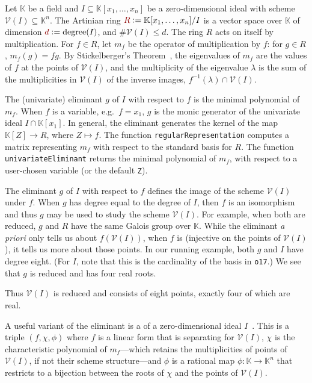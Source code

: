 \documentclass[12pt]{amsart}
\theoremstyle{definition}
\newcommand{\KK}{\mathbb{K}}
\newcommand{\calV}{\mathcal{V}}
\newcommand{\defcolor}[1]{{\color{TAMU}#1}}
\newcommand{\demph}[1]{\defcolor{{\sl #1}}}
\begin{document}
Let  $\KK$ be a field and $I\subseteq\KK[x_1,\dotsc,x_n]$ be a zero-dimension\-al ideal  with scheme $\calV(I)\subseteq\KK^n$.
The Artinian ring $\defcolor{R}\vcentcolon=\KK[x_1,\dotsc,x_n]/I$ is a vector space over $\KK$ of dimension
$\defcolor{d}\vcentcolon=\mbox{degree}(I)$, and $\#\calV(I)\leq d$.
The ring $R$ acts on itself by multiplication.
For $f\in R$, let \defcolor{$m_f$} be the operator of multiplication by $f$: for $g\in R$, $m_f(g)=fg$.
By Stickelberger's Theorem~\cite{Cox2021}, the eigenvalues of $m_f$ are the values of $f$ at the  points of $\calV(I)$,
and the multiplicity of the eigenvalue $\lambda$ is the sum of the multiplicities in $\calV(I)$ of the inverse images,
$f^{-1}(\lambda)\cap\calV(I)$. 


The (univariate) \defcolor{eliminant} \defcolor{$g$} of $I$ with respect to $f$ is the minimal polynomial of $m_f$.
When $f$ is a variable, e.g.\ $f=x_1$, $g$ is the monic generator of the univariate ideal $I\cap\KK[x_1]$.
In general, the eliminant generates the kernel of the map $\KK[Z]\to R$, where $Z\mapsto f$.
The function \texttt{regularRepresentation} computes a matrix representing $m_f$ with respect to the standard basis for $R$.
The function \texttt{univariateEliminant} returns the minimal polynomial of $m_f$, with respect to a user-chosen variable
(or the default \texttt{Z}). 
%
\begin{leftbar}

\end{leftbar}
%
The eliminant \defcolor{$g$} of $I$ with respect to $f$ defines the image of the scheme $\calV(I)$ under $f$.
When $g$ has degree equal to the degree of $I$, then $f$ is an isomorphism and thus $g$ may be used to study the scheme
$\calV(I)$.
For example, when both are reduced, $g$ and $R$ have the same Galois group over $\KK$.
While the eliminant {\it a priori} only tells us about $f(\calV(I))$, when $f$ is \demph{separating} (injective on the
points of $\calV(I)$), it tells us more about those points.
In our running example, both $g$ and $I$ have degree eight. (For $I$, note that this is the cardinality of the basis in \texttt{o17}.)
We see that $g$ is reduced and has four real roots.
%
\begin{leftbar}

\end{leftbar}
%
\noindent Thus $\calV(I)$ is reduced and consists of eight points, exactly four of which are real.

A useful variant of the eliminant is a \demph{rational univariate representation} of a zero-dimension\-al ideal $I$~\cite[Sect.\ 11.4]{BPR}.
This is a triple \defcolor{$(f,\chi,\phi)$} where $f$ is a linear form that is separating for $\calV(I)$, $\chi$ is the characteristic
polynomial of $m_f$---which retains the multiplicities of points of $\calV(I)$, if not their scheme structure---and $\phi$
is a rational map $\phi\colon\KK\to\KK^n$ that restricts to a bijection between the roots of $\chi$ and the points of $\calV(I)$.
%
\begin{leftbar}

\end{leftbar}
%
\end{document}
